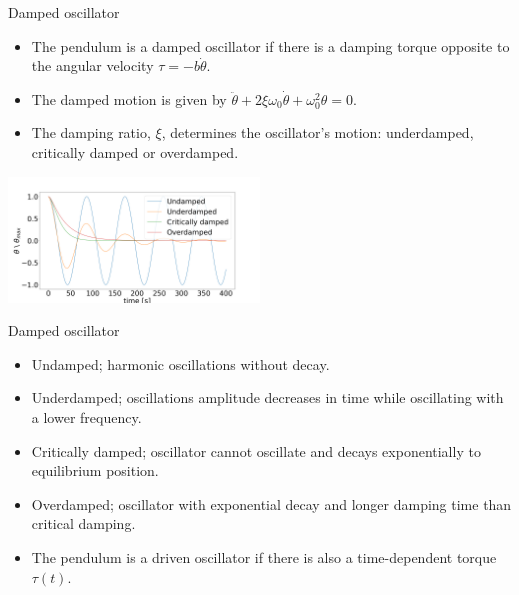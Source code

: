 \documentclass{beamer}
\begin{document}
\begin{frame}{Damped oscillator}
	
	\begin{itemize}	
		\item The pendulum is a damped oscillator if there is a damping torque opposite to the angular velocity $\tau = -b\dot{\theta}$.
		\pause
		\item The damped motion is given by $\ddot{\theta} + 2\xi\omega_0\dot{\theta} + \omega_0^2\theta = 0$.
		\pause
		\item The damping ratio, $\xi$, determines the oscillator's motion: underdamped, critically damped or overdamped.
	\end{itemize}
	\begin{center}		
		\includegraphics[width=0.5\textwidth,keepaspectratio]{damp.png}
    \end{center}
	
\end{frame}

\begin{frame}{Damped oscillator}
	
	\begin{itemize}
		\item Undamped; harmonic oscillations without decay.
		\pause
		\item Underdamped; oscillations amplitude decreases in time while oscillating with a lower frequency.
		\pause
		\item Critically damped; oscillator cannot oscillate and decays exponentially to equilibrium position.
		\pause
		\item Overdamped; oscillator with exponential decay and longer damping time than critical damping. 
		\pause
		\item The pendulum is a driven oscillator if there is also a time-dependent torque $\tau(t)$.
	\end{itemize}
\end{frame}
\end{document}
